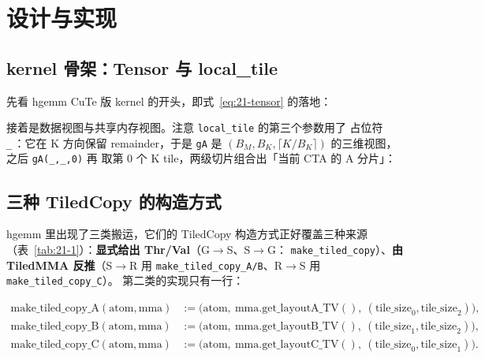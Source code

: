 \section{设计与实现}

\subsection{kernel 骨架：Tensor 与 local\_tile}

先看 hgemm CuTe 版 kernel 的开头，即式~\eqref{eq:21-tensor} 的落地：



接着是数据视图与共享内存视图。注意 \texttt{local\_tile} 的第三个参数用了
占位符 \texttt{\_}\,：它在 K 方向保留 remainder，于是 \texttt{gA} 是
$(B_M, B_K, \lceil K/B_K\rceil)$ 的三维视图，之后 \texttt{gA(\_,\_,0)} 再
取第 0 个 K tile，两级切片组合出「当前 CTA 的 A 分片」：



\subsection{三种 TiledCopy 的构造方式}

hgemm 里出现了三类搬运，它们的 TiledCopy 构造方式正好覆盖三种来源
（表~\ref{tab:21-1}）：\textbf{显式给出 Thr/Val}（G$\to$S、S$\to$G：
\texttt{make\_\allowbreak{}tiled\_\allowbreak{}copy}）、\textbf{由 TiledMMA 反推}（S$\to$R 用
\texttt{make\_\allowbreak{}tiled\_\allowbreak{}copy\_\allowbreak{}A/\allowbreak{}B}、R$\to$S 用 \texttt{make\_\allowbreak{}tiled\_\allowbreak{}copy\_\allowbreak{}C}）。
第二类的实现只有一行：

\begin{align}
  \mathrm{make\_tiled\_copy\_A}(\mathrm{atom}, \mathrm{mma}) &:=
    \bigl(\mathrm{atom},\ \mathrm{mma.get\_layoutA\_TV()},\
    (\mathrm{tile\_size}_0, \mathrm{tile\_size}_2)\bigr), \label{eq:21-mtca}\\
  \mathrm{make\_tiled\_copy\_B}(\mathrm{atom}, \mathrm{mma}) &:=
    \bigl(\mathrm{atom},\ \mathrm{mma.get\_layoutB\_TV()},\
    (\mathrm{tile\_size}_1, \mathrm{tile\_size}_2)\bigr), \label{eq:21-mtcb}\\
  \mathrm{make\_tiled\_copy\_C}(\mathrm{atom}, \mathrm{mma}) &:=
    \bigl(\mathrm{atom},\ \mathrm{mma.get\_layoutC\_TV()},\
    (\mathrm{tile\_size}_0, \mathrm{tile\_size}_1)\bigr). \label{eq:21-mtcc}
\end{align}

